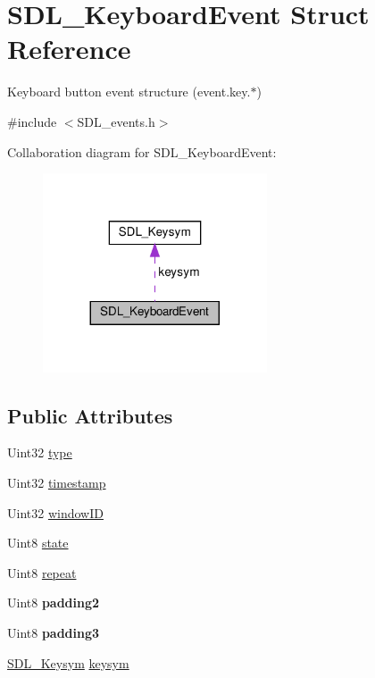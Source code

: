 \hypertarget{structSDL__KeyboardEvent}{}\section{S\+D\+L\+\_\+\+Keyboard\+Event Struct Reference}
\label{structSDL__KeyboardEvent}


Keyboard button event structure (event.\+key.$\ast$)  




{\ttfamily \#include $<$S\+D\+L\+\_\+events.\+h$>$}



Collaboration diagram for S\+D\+L\+\_\+\+Keyboard\+Event\+:\nopagebreak
\begin{figure}[H]
\begin{center}
\leavevmode
\includegraphics[width=188pt]{structSDL__KeyboardEvent__coll__graph}
\end{center}
\end{figure}
\subsection*{Public Attributes}
\begin{DoxyCompactItemize}
\item 
Uint32 \hyperlink{structSDL__KeyboardEvent_ae0b2f2aace6f80c1f47e5a14350d409a}{type}
\item 
Uint32 \hyperlink{structSDL__KeyboardEvent_a3da1d8f6892e7f6ee28d9eafdb5e7d02}{timestamp}
\item 
Uint32 \hyperlink{structSDL__KeyboardEvent_a56efb6780b96acd5b50d8f797efb3546}{window\+ID}
\item 
Uint8 \hyperlink{structSDL__KeyboardEvent_a110558eb96c113c86cfa31a7018c2346}{state}
\item 
Uint8 \hyperlink{structSDL__KeyboardEvent_a3edac3b36304812d533795c9df4ed4c1}{repeat}
\item 
\mbox{\label{structSDL__KeyboardEvent_ae270122f757f76171318294afd2c95e6}} 
Uint8 {\bfseries padding2}
\item 
\mbox{\label{structSDL__KeyboardEvent_ae1831035ef556a7b09efcd2469f26f7a}} 
Uint8 {\bfseries padding3}
\item 
\hyperlink{structSDL__Keysym}{S\+D\+L\+\_\+\+Keysym} \hyperlink{structSDL__KeyboardEvent_a2a57ba820a298f2c02ad5d41fd2b1aa8}{keysym}
\end{DoxyCompactItemize}


